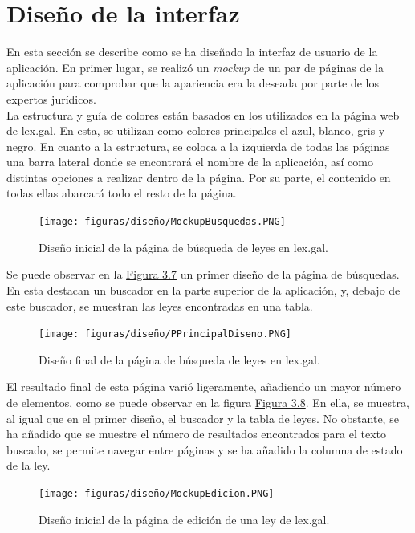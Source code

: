 \section{Diseño de la interfaz}

En esta sección se describe como se ha diseñado la interfaz de usuario de la aplicación. En primer lugar, se realizó un {\it mockup} \cite{mockup} de un par de páginas de la aplicación para comprobar que la apariencia era la deseada por parte de los expertos jurídicos.
\\

La estructura y guía de colores están basados en los utilizados en la página web de lex.gal. En esta, se utilizan como colores principales el azul, blanco, gris y negro. En cuanto a la estructura, se coloca a la izquierda de todas las páginas una barra lateral donde se encontrará el nombre de la aplicación, así como distintas opciones a realizar dentro de la página. Por su parte, el contenido en todas ellas abarcará todo el resto de la página.

\begin{figure}[H]
\centerline{\texttt{[image: figuras/diseño/MockupBusquedas.PNG]}}
\caption{Diseño inicial de la página de búsqueda de leyes en lex.gal.}
\label{enlaceMockupPrincipalDiseno}
\end{figure}

Se puede observar en la \hyperref[enlaceMockupPrincipalDiseno]{Figura 3.7} un primer diseño de la página de búsquedas. En esta destacan un buscador en la parte superior de la aplicación, y, debajo de este buscador, se muestran las leyes encontradas en una tabla.

\begin{figure}[H]
\centerline{\texttt{[image: figuras/diseño/PPrincipalDiseno.PNG]}}
\caption{Diseño final de la página de búsqueda de leyes en lex.gal.}
\label{enlacePPrincipalDiseno}
\end{figure}

El resultado final de esta página varió ligeramente, añadiendo un mayor número de elementos, como se puede observar en la figura \hyperref[enlacePPrincipalDiseno]{Figura 3.8}. En ella, se muestra, al igual que en el primer diseño, el buscador y la tabla de leyes. No obstante, se ha añadido que se muestre el número de resultados encontrados para el texto buscado, se permite navegar entre páginas y se ha añadido la columna de estado de la ley.

\begin{figure}[H]
\centerline{\texttt{[image: figuras/diseño/MockupEdicion.PNG]}}
\caption{Diseño inicial de la página de edición de una ley de lex.gal.}
\label{enlaceMockupEdicionDiseno}
\end{figure}

